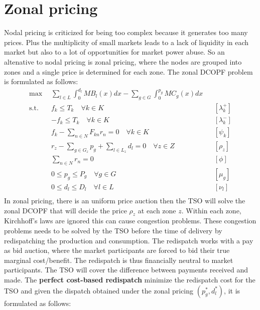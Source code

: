 \documentclass[12pt, openany]{report}
\theoremstyle{definition}
\begin{document}
\section{Zonal pricing}
Nodal pricing is criticized for being too complex because it generates too many prices. Plus the multiplicity of small markets leads to a lack of liquidity in each market but also to a lot of opportunities for market power abuse. So an altenative to nodal pricing is zonal pricing, where the nodes are grouped into zones and a single price is determined for each zone. The zonal DCOPF problem is formulated as follows:
\begin{equation}
    \begin{aligned}
        \max & \sum_{l \in L}  \int_{0}^{d_l} MB_l(x)dx - \sum_{g \in G} \int_{0}^{p_g} MC_g(x)dx &&\\
        \text{s.t.} \quad & f_k \leq T_k \quad \forall k \in K  && [\lambda_k^+] \\
        & -f_k \leq T_k \quad \forall k \in K  && [\lambda_k^-] \\
        & f_k - \sum_{n \in N} F_{kn} r_n = 0 \quad \forall k \in K  && [\psi_k] \\
        & r_z - \sum_{g \in G_z} p_g + \sum_{l \in L_z} d_l = 0 \quad \forall z \in Z  && [\rho_z] \\
        & \sum_{n \in N} r_n = 0 && [\phi] \\
        & 0 \leq p_g \leq P_g \quad \forall g \in G  && [\mu_g] \\
        & 0 \leq d_l \leq D_l \quad \forall l \in L  && [\nu_l] \\
    \end{aligned}
\end{equation}
In zonal pricing, there is an uniform price auction then the TSO will solve the zonal DCOPF that will decide the price $\rho_z$ at each zone $z$. Within each zone, Kirchhoff's laws are ignored this can cause congestion problems. These congestion problems needs to be solved by the TSO before the time of delivery by redispatching the production and consumption. The redispatch works with a pay as bid auction, where the market participants are forced to bid their true marginal cost/benefit. The redispatch is thus financially neutral to market participants. The TSO will cover the difference between payments received and made. The \textbf{perfect cost-based redispatch} minimize the redispatch cost for the TSO and given the dispatch obtained under the zonal pricing $(p_g^*,d_l^*)$, it is formulated as follows:
\end{document}
